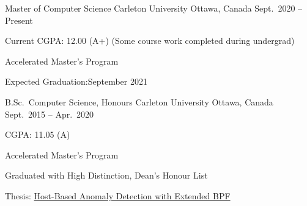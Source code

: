 

\begin{cventries}

  \cventry
    {Master of Computer Science} %
    {Carleton University} %
    {Ottawa, Canada} %
    {Sept.~2020 -- Present} %
    {
      \begin{cvitems} %
        \item {Current CGPA: 12.00 (A+) (Some course work completed during undergrad)}
        \item {Accelerated Master's Program}
        \item {Expected Graduation:\@ September 2021}
      \end{cvitems}
    }

  \cventry
    {B.Sc.~Computer Science, Honours} %
    {Carleton University} %
    {Ottawa, Canada} %
    {Sept.~2015 -- Apr.~2020} %
    {
      \begin{cvitems} %
        \item {CGPA: 11.05 (A)}
        \item {Accelerated Master's Program}
        \item {Graduated with High Distinction, Dean's Honour List}
        \item {Thesis: \href{https://www.cisl.carleton.ca/~will/written/coursework/undergrad-ebpH-thesis.pdf}
          {Host-Based Anomaly Detection with Extended BPF}}
      \end{cvitems}
    }

\end{cventries}
